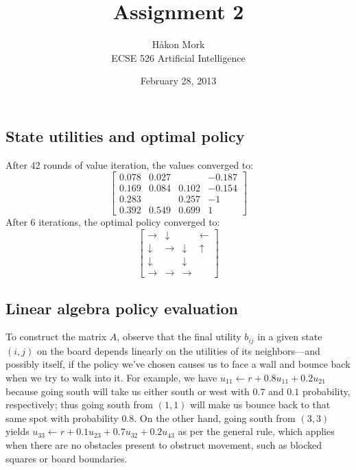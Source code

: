 \documentclass[letterpaper, 10pt]{article}
\title{\textbf{Assignment 2}}
\author{Håkon Mork \\ ECSE 526 Artificial Intelligence}
\date{February 28, 2013}
\begin{document}
\maketitle
\noindent
\begin{multicols}{2}

\section{}
\subsection{State utilities and optimal policy}
After 42 rounds of value iteration, the values converged to:
\[
	\begin{bmatrix}
		0.078 & 0.027 &       & -0.187 \\
		0.169 & 0.084 & 0.102 & -0.154 \\
		0.283 &       & 0.257 & -1 \\
		0.392 & 0.549 & 0.699 & 1
	\end{bmatrix}
\]
After 6 iterations, the optimal policy converged to:
\[
	\begin{bmatrix}
		\rightarrow & \downarrow &       & \leftarrow \\
		\downarrow & \rightarrow & \downarrow & \uparrow \\
		\downarrow &       & \downarrow &  \\
		\rightarrow & \rightarrow & \rightarrow & 
	\end{bmatrix}
\]


\subsection{Linear algebra policy evaluation}
To construct the matrix $A$, observe that the final utility $b_{ij}$ in a given state $(i, j)$ on the board depends linearly on the utilities of its neighbors---and possibly itself, if the policy we've chosen causes us to face a wall and bounce back when we try to walk into it. 
For example, we have $u_{11} \gets r + 0.8 u_{11} + 0.2 u_{21}$ because going south will take us either south or west with $0.7$ and $0.1$ probability, respectively; thus going south from $(1,1)$ will make us bounce back to that same spot with probability $0.8$. 
On the other hand, going south from $(3,3)$ yields $u_{33} \gets r + 0.1 u_{23} + 0.7 u_{32} + 0.2 u_{43}$ as per the general rule, which applies when there are no obstacles present to obstruct movement, such as blocked squares or board boundaries. 


\end{multicols}
\end{document}
